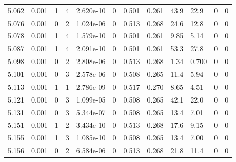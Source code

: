 \documentclass[preview]{standalone}
\begin{document}
{{{{{{{{{{{{{\begin{tabular}{L{1.2cm}C{1.2cm} C{0.3cm}C{0.5cm} C{1.4cm}C{1.4cm} C{1.4cm}C{1.4cm} C{1.6cm}C{1.6cm} C{1.6cm}C{1.6cm}}
  5.062  &  0.001  & 1     &  4 &  2.620e-10  & 0  &  0.501&   0.261& 43.9 & 22.9   &  0 & 0  \\ 
  5.076  &  0.001  & 0     &  2 &  1.024e-06  & 0  &  0.513&   0.268& 24.6 & 12.8   &  0 & 0  \\ 
  5.078  &  0.001  & 1     &  4 &  1.579e-10  & 0  &  0.501&   0.261& 9.85 & 5.14   &  0 & 0  \\ 
  5.087  &  0.001  & 1     &  4 &  2.091e-10  & 0  &  0.501&   0.261& 53.3 & 27.8   &  0 & 0  \\ 
  5.098  &  0.001  & 0     &  2 &  2.808e-06  & 0  &  0.513&   0.268& 1.34 & 0.700   &  0 & 0  \\ 
  5.101  &  0.001  & 0     &  3 &  2.578e-06  & 0  &  0.508&   0.265& 11.4 & 5.94   &  0 & 0  \\ 
  5.113  &  0.001  & 1     &  1 &  2.786e-09  & 0  &  0.517&   0.270& 8.65 & 4.51   &  0 & 0  \\ 
  5.121  &  0.001  & 0     &  3 &  1.099e-05  & 0  &  0.508&   0.265& 42.1 & 22.0   &  0 & 0  \\ 
  5.131  &  0.001  & 0     &  3 &  5.344e-07  & 0  &  0.508&   0.265& 13.4 & 7.01   &  0 & 0  \\ 
  5.151  &  0.001  & 1     &  2 &  3.434e-10  & 0  &  0.513&   0.268& 17.6 & 9.15   &  0 & 0  \\ 
  5.155  &  0.001  & 1     &  3 &  1.085e-10  & 0  &  0.508&   0.265& 13.4 & 7.00   &  0 & 0  \\ 
  5.156  &  0.001  & 0     &  2 &  6.584e-06  & 0  &  0.513&   0.268& 21.8 & 11.4   &  0 & 0  \\ 
\hline 
\end{tabular} 

}}}}}}}}}}}}}
\end{document}
